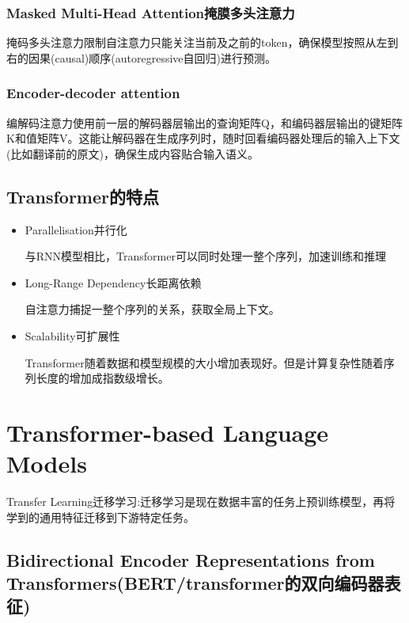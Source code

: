 \documentclass[UTF8]{ctexart}
\begin{document}
\subsubsection{Masked Multi-Head Attention掩膜多头注意力}

掩码多头注意力限制自注意力只能关注当前及之前的token，确保模型按照从左到右的因果(causal)顺序(autoregressive自回归)进行预测。

\subsubsection{Encoder-decoder attention}

编解码注意力使用前一层的解码器层输出的查询矩阵Q，和编码器层输出的键矩阵K和值矩阵V。这能让解码器在生成序列时，随时回看编码器处理后的输入上下文(比如翻译前的原文)，确保生成内容贴合输入语义。

\subsection{Transformer的特点}

\begin{itemize}
    \item Parallelisation并行化
    
    与RNN模型相比，Transformer可以同时处理一整个序列，加速训练和推理
    \item Long-Range Dependency长距离依赖
    
    自注意力捕捉一整个序列的关系，获取全局上下文。
    \item Scalability可扩展性
    
    Transformer随着数据和模型规模的大小增加表现好。但是计算复杂性随着序列长度的增加成指数级增长。
\end{itemize}


\section{Transformer-based Language Models}

Transfer Learning迁移学习:迁移学习是现在数据丰富的任务上预训练模型，再将学到的通用特征迁移到下游特定任务。

\subsection{Bidirectional Encoder Representations from Transformers(BERT/transformer的双向编码器表征)}
\end{document}
